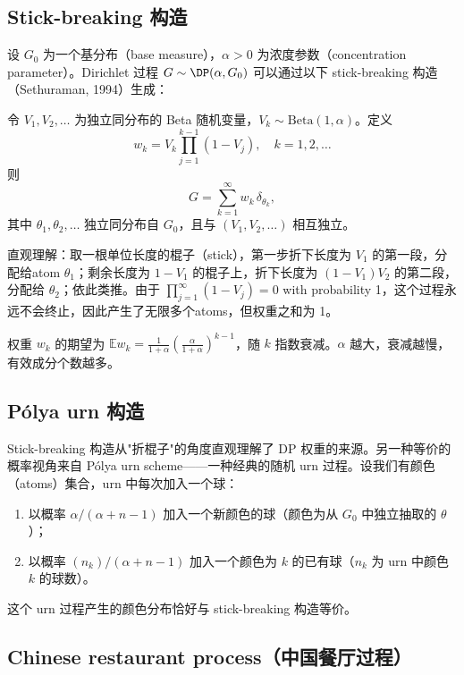 \subsection{Stick-breaking 构造}

设 $G_0$ 为一个基分布（base measure），$\alpha > 0$ 为浓度参数（concentration parameter）。Dirichlet 过程 $G \sim \DP(\alpha, G_0)$ 可以通过以下 stick-breaking 构造（Sethuraman, 1994）生成：

\begin{Definition}
令 $V_1, V_2, \ldots$ 为独立同分布的 Beta 随机变量，$V_k \sim \mathrm{Beta}(1, \alpha)$。定义
\[
w_k = V_k \prod_{j=1}^{k-1} (1 - V_j), \quad k = 1, 2, \ldots
\]
则
\[
G = \sum_{k=1}^{\infty} w_k \, \delta_{\theta_k},
\]
其中 $\theta_1, \theta_2, \ldots$ 独立同分布自 $G_0$，且与 $(V_1, V_2, \ldots)$ 相互独立。
\end{Definition}

直观理解：取一根单位长度的棍子（stick），第一步折下长度为 $V_1$ 的第一段，分配给atom $\theta_1$；剩余长度为 $1-V_1$ 的棍子上，折下长度为 $(1-V_1)V_2$ 的第二段，分配给 $\theta_2$；依此类推。由于 $\prod_{j=1}^{\infty}(1-V_j) = 0$ with probability 1，这个过程永远不会终止，因此产生了无限多个atoms，但权重之和为 1。

权重 $w_k$ 的期望为 $\mathbb{E}w_k = \frac{1}{1+\alpha}\left(\frac{\alpha}{1+\alpha}\right)^{k-1}$，随 $k$ 指数衰减。$\alpha$ 越大，衰减越慢，有效成分个数越多。

\subsection{Pólya urn 构造}

Stick-breaking 构造从"折棍子"的角度直观理解了 DP 权重的来源。另一种等价的概率视角来自 Pólya urn scheme——一种经典的随机 urn 过程。设我们有颜色（atoms）集合，urn 中每次加入一个球：

\begin{enumerate}
  \item 以概率 $\alpha/(\alpha + n-1)$ 加入一个新颜色的球（颜色为从 $G_0$ 中独立抽取的 $\theta$）；
  \item 以概率 $(n_k)/( \alpha + n - 1)$ 加入一个颜色为 $k$ 的已有球（$n_k$ 为 urn 中颜色 $k$ 的球数）。
\end{enumerate}

这个 urn 过程产生的颜色分布恰好与 stick-breaking 构造等价。

\subsection{Chinese restaurant process（中国餐厅过程）}

